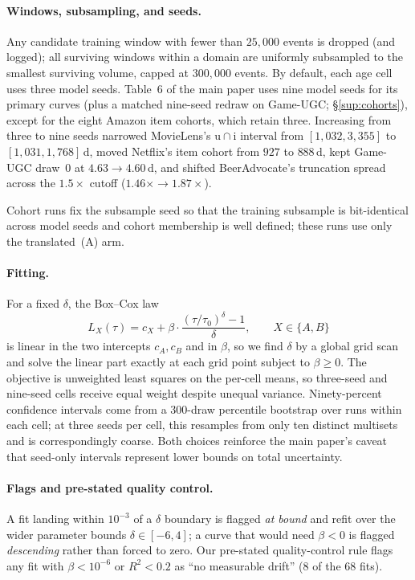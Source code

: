\documentclass[10pt,letterpaper]{article}
\begin{document}
\paragraph{Windows, subsampling, and seeds.}
Any candidate training window with fewer than $25{,}000$ events is dropped
(and logged); all surviving windows within a domain are uniformly subsampled to
the smallest surviving volume, capped at $300{,}000$ events. By default, each
age cell uses three model seeds. Table~6 of the main paper uses nine model seeds
for its primary curves (plus a matched nine-seed redraw on Game-UGC;
\S\ref{sup:cohorts}), except for the eight Amazon item cohorts, which retain
three. Increasing from three to nine seeds narrowed MovieLens's
$\mathrm{u}{\cap}\mathrm{i}$ interval from $[1{,}032, 3{,}355]$ to
$[1{,}031, 1{,}768]$\,d, moved Netflix's item cohort from $927$ to $888$\,d,
kept Game-UGC draw~0 at $4.63{\to}4.60$\,d, and shifted BeerAdvocate's
truncation spread across the $1.5\times$ cutoff ($1.46\times{\to}1.87\times$).

Cohort runs fix the subsample seed so that the training subsample is
bit-identical across model seeds and cohort membership is well defined; these
runs use only the translated~(A) arm.

\paragraph{Fitting.}
For a fixed $\delta$, the Box--Cox law
\begin{equation}
L_X(\tau) = c_X + \beta \cdot \frac{(\tau/\tau_0)^{\delta}-1}{\delta},
\qquad X \in \{A, B\}
\label{eq:boxcox}
\end{equation}
is linear in the two intercepts $c_A, c_B$ and in $\beta$, so we find
$\delta$ by a global grid scan and solve the linear part exactly at each
grid point subject to $\beta \ge 0$. The objective is unweighted least
squares on the per-cell means, so three-seed and nine-seed cells receive
equal weight despite unequal variance. Ninety-percent confidence intervals come
from a 300-draw percentile bootstrap over runs within each cell; at three seeds
per cell, this resamples from only ten distinct multisets and is
correspondingly coarse. Both choices reinforce the main paper's caveat that
seed-only intervals represent lower bounds on total uncertainty.

\paragraph{Flags and pre-stated quality control.}
A fit landing within $10^{-3}$ of a $\delta$ boundary is flagged
\emph{at bound} and refit over the wider parameter bounds $\delta \in [-6, 4]$;
a curve that would need $\beta < 0$ is flagged \emph{descending} rather than
forced to zero. Our pre-stated quality-control rule flags any fit with
$\beta < 10^{-6}$ or $R^2 < 0.2$ as ``no measurable drift'' (8 of the 68 fits).
\end{document}
